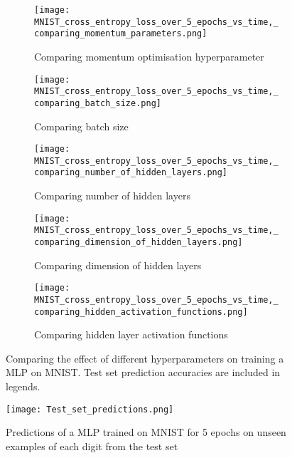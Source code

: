 \begin{figure}
    \centering
    \begin{subfigure}{0.45\textwidth}
        \centering
        \texttt{[image: MNIST\_cross\_entropy\_loss\_over\_5\_epochs\_vs\_time,\_comparing\_momentum\_parameters.png]}
        \caption{Comparing momentum optimisation hyperparameter}
        \label{fig:mnist momentum}
    \end{subfigure}
    \begin{subfigure}{0.45\textwidth}
        \centering
        \texttt{[image: MNIST\_cross\_entropy\_loss\_over\_5\_epochs\_vs\_time,\_comparing\_batch\_size.png]}
        \caption{Comparing batch size}
        \label{fig:mnist batch size}
    \end{subfigure}
    \newline
    \begin{subfigure}{0.45\textwidth}
        \centering
        \texttt{[image: MNIST\_cross\_entropy\_loss\_over\_5\_epochs\_vs\_time,\_comparing\_number\_of\_hidden\_layers.png]}
        \caption{Comparing number of hidden layers}
        \label{fig:mnist num hidden layers}
    \end{subfigure}
    \begin{subfigure}{0.45\textwidth}
        \centering
        \texttt{[image: MNIST\_cross\_entropy\_loss\_over\_5\_epochs\_vs\_time,\_comparing\_dimension\_of\_hidden\_layers.png]}
        \caption{Comparing dimension of hidden layers}
        \label{fig:mnist hidden dimension}
    \end{subfigure}
    \newline
    \begin{subfigure}{0.45\textwidth}
        \centering
        \texttt{[image: MNIST\_cross\_entropy\_loss\_over\_5\_epochs\_vs\_time,\_comparing\_hidden\_activation\_functions.png]}
        \caption{Comparing hidden layer activation functions}
        \label{fig:mnist activation function}
    \end{subfigure}
    \caption{Comparing the effect of different hyperparameters on training a MLP on MNIST. Test set prediction accuracies are included in legends.}
    \label{fig:mnist parameters}
\end{figure}
\begin{figure}
    \centering
    \texttt{[image: Test\_set\_predictions.png]}
    \caption{Predictions of a MLP trained on MNIST for 5 epochs on unseen examples of each digit from the test set}
    \label{fig:mnist predictions}
\end{figure}
